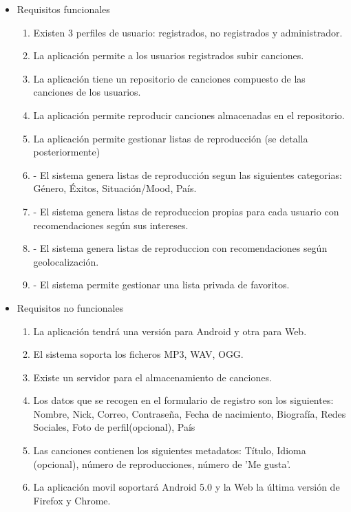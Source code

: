 \begin{itemize}
\item Requisitos funcionales
\begin{enumerate}
	\item Existen 3 perfiles de usuario: registrados, no registrados y administrador.
	\item La aplicación permite a los usuarios registrados subir canciones.
	\item La aplicación tiene un repositorio de canciones compuesto de las canciones de los usuarios.
	\item La aplicación permite reproducir canciones almacenadas en el repositorio.
	\item La aplicación permite gestionar listas de reproducción (se detalla posteriormente)
	\item - El sistema genera listas de reproducción segun las siguientes categorias: Género, Éxitos, Situación/Mood, País.
	\item - El sistema genera listas de reproduccion propias para cada usuario con recomendaciones según sus intereses.
	\item - El sistema genera listas de reproduccion con recomendaciones según geolocalización.
	\item - El sistema permite gestionar una lista privada de favoritos.

\end{enumerate}

\item Requisitos no funcionales
\begin{enumerate}
	\item La aplicación tendrá una versión para Android y otra para Web.
	\item El sistema soporta los ficheros MP3, WAV, OGG.
	\item Existe un servidor para el almacenamiento de canciones.
	\item Los datos que se recogen en el formulario de registro son los siguientes: Nombre, Nick, Correo, Contraseña, Fecha de nacimiento, Biografía, Redes Sociales, Foto de perfil(opcional), País
	\item Las canciones contienen los siguientes metadatos: Título, Idioma (opcional), número de reproducciones, número de 'Me gusta'.
	\item La aplicación movil soportará Android 5.0 y la Web la última versión de Firefox y Chrome.
\end{enumerate}

\end{itemize}

